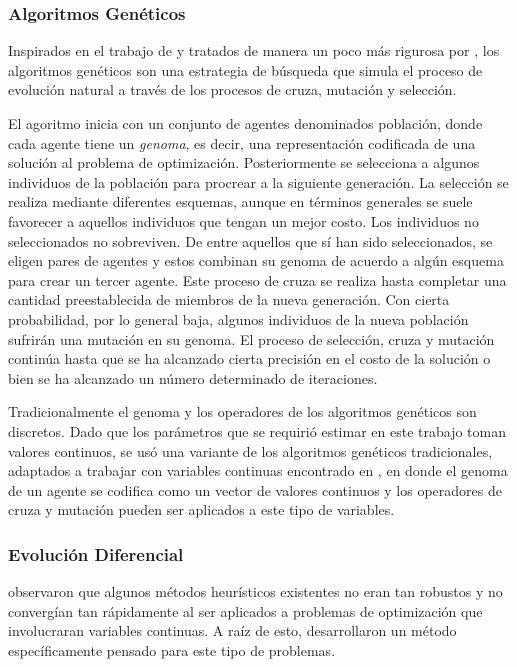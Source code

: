 \subsubsection{Algoritmos Genéticos}

Inspirados en el trabajo de \citeauthor{holland1975} \citep{holland1975} y tratados de manera un poco más rigurosa por \citeauthor{Goldberg1989} \citep{Goldberg1989}, los algoritmos genéticos son una estrategia de búsqueda que simula el proceso de evolución natural a través de los procesos de cruza, mutación y selección.

El agoritmo inicia con un conjunto de agentes denominados población, donde cada agente tiene un \emph{genoma}, es decir, una representación codificada de una solución al problema de optimización. Posteriormente se selecciona a algunos individuos de la población para procrear a la siguiente generación. La selección se realiza mediante diferentes esquemas, aunque en términos generales se suele favorecer a aquellos individuos que tengan un mejor costo. Los individuos no seleccionados no sobreviven. De entre aquellos que sí han sido seleccionados, se eligen pares de agentes y estos combinan su genoma de acuerdo a algún esquema para crear un tercer agente. Este proceso de cruza se realiza hasta completar una cantidad preestablecida de miembros de la nueva generación. Con cierta probabilidad, por lo general baja, algunos individuos de la nueva población sufrirán una mutación en su genoma. El proceso de selección, cruza y mutación continúa hasta que se ha alcanzado cierta precisión en el costo de la solución o bien se ha alcanzado un número determinado de iteraciones.

Tradicionalmente el genoma y los operadores de los algoritmos genéticos son discretos. Dado que los parámetros que se requirió estimar en este trabajo toman valores continuos, se usó una variante de los algoritmos genéticos tradicionales, adaptados a trabajar con variables continuas encontrado en \citeauthor{Haupt1998} \citep{Haupt1998}, en donde el genoma de un agente se codifica como un vector de valores continuos y los operadores de cruza y mutación pueden ser aplicados a este tipo de variables.

\subsubsection{Evolución Diferencial}\label{difEvol}

\citeauthor{Storn1997} \citep{Storn1997} observaron que algunos métodos heurísticos existentes no eran tan robustos y no convergían tan rápidamente al ser aplicados a problemas de optimización que involucraran variables continuas. A raíz de esto, desarrollaron un método específicamente pensado para este tipo de problemas. 

